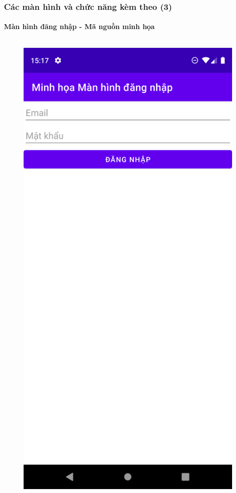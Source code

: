 \documentclass{beamer}
\begin{document}
\begin{frame}
    \frametitle{Các màn hình và chức năng kèm theo (3)}
    \framesubtitle{Màn hình đăng nhập - Mã nguồn minh họa}

    \begin{columns}
        \begin{figure}
            \centering
            \includegraphics[height=0.7\textheight]{images/24.png}

\end{figure}
\end{columns}
\end{frame}
\end{document}
